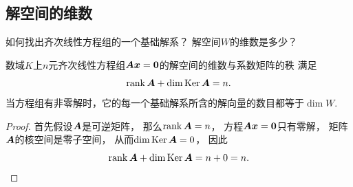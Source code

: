 \subsection{解空间的维数}
如何找出齐次线性方程组的一个基础解系？
解空间\(W\)的维数是多少？

\begin{theorem}\label{theorem:线性方程组.齐次线性方程组的解向量个数}
数域\(K\)上\(n\)元齐次线性方程组\(\boldsymbol{A} \boldsymbol{x} = \boldsymbol0\)的解空间的维数与系数矩阵的秩
满足\begin{equation}
	\rank\boldsymbol{A} + \dim\operatorname{Ker}\boldsymbol{A} = n.
\end{equation}
当方程组有非零解时，它的每一个基础解系所含的解向量的数目都等于\(\dim W\).
\begin{proof}
首先假设\(\boldsymbol{A}\)是可逆矩阵，
那么\(\rank\boldsymbol{A} = n\)，
方程\(\boldsymbol{A} \boldsymbol{x} = \boldsymbol0\)只有零解，
矩阵\(\boldsymbol{A}\)的核空间是零子空间，
从而\(\dim\operatorname{Ker}\boldsymbol{A} = 0\)，
因此\begin{equation*}
	\rank\boldsymbol{A} + \dim\operatorname{Ker}\boldsymbol{A}
	= n + 0
	= n.
\end{equation*}


\end{proof}
\end{theorem}
